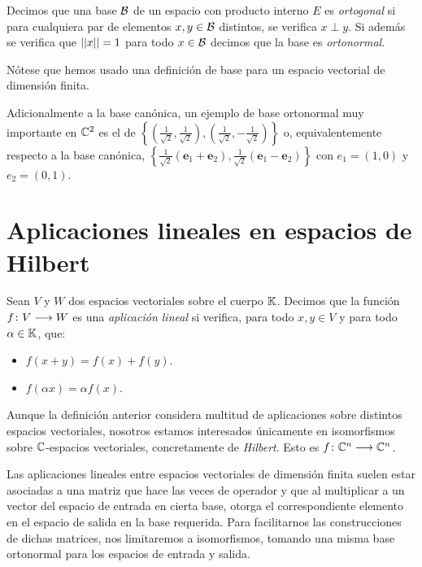 \begin{definition} Decimos que una base $\mathcal{B}$ de un espacio con producto interno $E$ es \textit{ortogonal} si para cualquiera par de elementos $x,y\in\mathcal{B}$ distintos, se verifica $x\perp y$. Si además se verifica que $\left|\left|x\right|\right|=1$ para todo $x\in\mathcal{B}$ decimos que la base es \textit{ortonormal}.

Nótese que hemos usado una definición de base para un espacio vectorial de dimensión finita.
\end{definition}

\begin{example} \label{ex:ex34} Adicionalmente a la base canónica, un ejemplo de base ortonormal muy importante en $\mathbb{C}^2$ es el de $\left\{\left(\frac{1}{\sqrt{2}},\frac{1}{\sqrt{2}}\right),\left(\frac{1}{\sqrt{2}},-\frac{1}{\sqrt{2}}\right)\right\}$ o, equivalentemente respecto a la base canónica, $\left\{\frac{1}{\sqrt{2}}\left(\textbf{e}_1 + \textbf{e}_2\right),\frac{1}{\sqrt{2}}\left(\textbf{e}_1 - \textbf{e}_2\right)\right\}$ con $e_1=(1,0)$ y $e_2=(0,1)$.
\end{example}

\section{Aplicaciones lineales en espacios de Hilbert}

\begin{definition} Sean $V$ y $W$ dos espacios vectoriales sobre el cuerpo $\mathbb{K}$. Decimos que la función $f\colon V\longrightarrow W$ es una \textit{aplicación lineal} si verifica, para todo $x,y\in V$ y para todo $\alpha\in\mathbb{K}$, que:
\begin{itemize}
\item $f(x+y)=f(x)+f(y)$.
\item $f(\alpha x)=\alpha f(x)$.
\end{itemize}
\end{definition}

Aunque la definición anterior considera multitud de aplicaciones sobre distintos espacios vectoriales, nosotros estamos interesados únicamente en isomorfismos sobre $\mathbb{C}$-espacios vectoriales, concretamente de \textit{Hilbert}. Esto es $f\colon \mathbb{C}^n\longrightarrow \mathbb{C}^n$.

Las aplicaciones lineales entre espacios vectoriales de dimensión finita suelen estar asociadas a una matriz que hace las veces de operador y que al multiplicar a un vector del espacio de entrada en cierta base, otorga el correspondiente elemento en el espacio de salida en la base requerida. Para facilitarnos las construcciones de dichas matrices, nos limitaremos a isomorfismos, tomando una misma base ortonormal para los espacios de entrada y salida.

